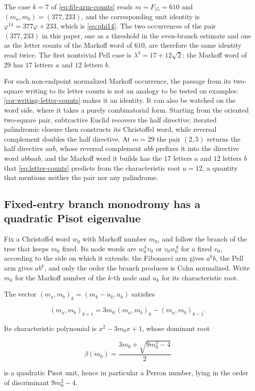 \begin{remark}
\label{rem:377-233}
The case $k=7$ of \cref{eq:fib-arm-counts} reads $m=F_{15}=610$ and
$(m_a,m_b)=(377,233)$, and the corresponding unit identity is
$\varphi^{14}=377\varphi+233$, which is \cref{eq:phi14}. The two occurrences
of the pair $(377,233)$ in this paper, one as a threshold in the
even-branch estimate and one as the letter counts of the Markoff word of
$610$, are therefore the same identity read twice. The first nontrivial Pell
case is $\lambda^4=17+12\sqrt2$: the Markoff word of $29$ has $17$ letters
$a$ and $12$ letters $b$.

For each non-endpoint normalized Markoff occurrence, the passage from its
two-square writing to its letter counts is not an analogy to be tested on
examples: \cref{cor:writing-letter-counts} makes it an identity. It can also
be watched on the word side, where it takes a purely combinatorial form.
Starting from the oriented two-square pair, subtractive Euclid recovers the
half directive; iterated palindromic closure then constructs its Christoffel
word, while reversal complement doubles the half directive. At $m=29$ the
pair $(2,5)$ returns the half directive $aab$, whose reversal complement
$abb$ prefixes it into the directive word $abbaab$, and the Markoff word
it builds has the $17$ letters $a$ and $12$ letters $b$ that
\cref{eq:letter-counts} predicts from the characteristic root $u=12$, a
quantity that mentions neither the pair nor any palindrome.
\end{remark}

\subsection{Fixed-entry branch monodromy has a quadratic Pisot eigenvalue}

Fix a Christoffel word $w_0$ with Markoff number $m_0$, and follow the branch
of the tree that keeps $m_0$ fixed. Its node words are $w_0^{\,k}v_0$ or
$v_0w_0^{\,k}$ for a fixed $v_0$, according to the side on which it extends:
the Fibonacci arm gives $a^kb$, the Pell arm gives $ab^k$, and only the
order the branch produces is Cohn normalized. Write $m_k$ for the Markoff
number of the $k$-th node and $u_k$ for its characteristic root.

\begin{proposition}
\label{prop:branch-recurrence}
The vector $(m_a,m_b)_k=(m_k-u_k,u_k)$ satisfies

\begin{equation}
 (m_a,m_b)_{k+1}
 =3m_0\,(m_a,m_b)_k-(m_a,m_b)_{k-1}.
 \label{eq:branch-recurrence}
\end{equation}

Its characteristic polynomial is $x^2-3m_0x+1$, whose dominant root

\begin{equation}
 \beta(m_0)=\frac{3m_0+\sqrt{9m_0^2-4}}2
 \label{eq:branch-perron}
\end{equation}

 is a quadratic Pisot unit, hence in particular a Perron number, lying in the
order of discriminant $9m_0^2-4$.
\end{proposition}

